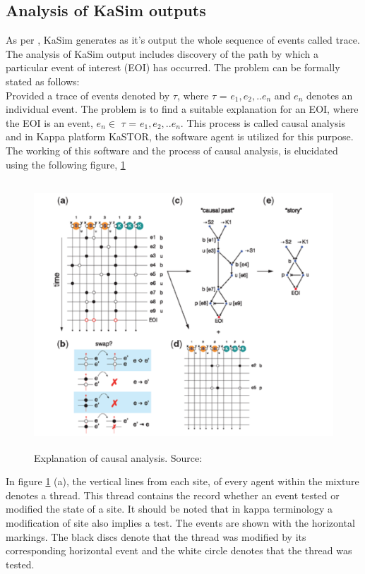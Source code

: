 \documentclass[msc,deptreport,ai]{infthesis}      %
\begin{document}
\subsection{Analysis of KaSim outputs}
As per \cite{kappaPlatform}, KaSim generates as it's output the whole sequence of events called trace. The analysis of KaSim output includes discovery of the path by which a particular event of interest (EOI) has occurred. The problem can be formally stated as follows: \\
Provided a trace of events denoted by $\tau$, where $\tau$ = $e_1,e_2,..e_n$ and $e_n$ denotes an individual event. The problem is to find a suitable explanation for an EOI, where the EOI is an event, $e_n \in$ $\tau$ = $e_1,e_2,..e_n$. This process is called causal analysis and in Kappa platform KaSTOR, the software agent is utilized for this purpose. The working of this software and the process of causal analysis, is elucidated using the following figure, \ref{fig:eoi}
\begin{figure}[H]
	\centering
	\captionsetup{justification=centering}
	\includegraphics[width=\linewidth,height=10cm,keepaspectratio]{eoi.png}	
	\caption{Explanation of causal analysis. Source: \cite{kappaPlatform}}
	\label{fig:eoi}
\end{figure}

In figure \ref{fig:eoi} (a), the vertical lines from each site, of every agent within the mixture denotes a thread. This thread contains the record whether an event tested or modified the state of a site. It should be noted that in kappa terminology a modification of site also implies a test. The events are shown with the horizontal markings. The black discs denote that the thread was modified by its corresponding horizontal event and the white circle denotes that the thread was tested.
\end{document}
